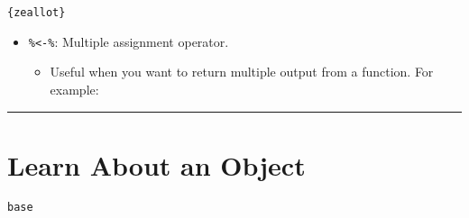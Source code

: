 \documentclass[
]{book}
\newenvironment{Shaded}{\begin{snugshade}}{\end{snugshade}}
\newcommand{\ControlFlowTok}[1]{\textcolor[rgb]{0.13,0.29,0.53}{\textbf{#1}}}
\newcommand{\DataTypeTok}[1]{\textcolor[rgb]{0.13,0.29,0.53}{#1}}
\newcommand{\KeywordTok}[1]{\textcolor[rgb]{0.13,0.29,0.53}{\textbf{#1}}}
\newcommand{\NormalTok}[1]{#1}
\newcommand{\OperatorTok}[1]{\textcolor[rgb]{0.81,0.36,0.00}{\textbf{#1}}}
\newcommand{\StringTok}[1]{\textcolor[rgb]{0.31,0.60,0.02}{#1}}
\providecommand{\tightlist}{%
  \setlength{\itemsep}{0pt}\setlength{\parskip}{0pt}}
\begin{document}
\texttt{\{zeallot\}}

\begin{itemize}
\tightlist
\item
  \texttt{\%\textless{}-\%}: Multiple assignment operator.

  \begin{itemize}
  \tightlist
  \item
    Useful when you want to return multiple output from a function. For example:
  \end{itemize}
\end{itemize}

\begin{Shaded}
\end{Shaded}

\begin{center}\rule{0.5\linewidth}{0.5pt}\end{center}

\hypertarget{learn-about-an-object}{%
\section{Learn About an Object}\label{learn-about-an-object}}

\texttt{base}
\end{document}
